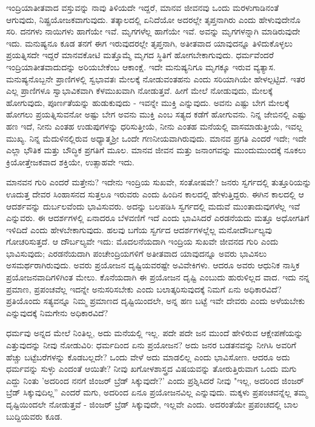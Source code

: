 ಇಂದ್ರಿಯಾತೀತವಾದ ವಸ್ತುವನ್ನು ನಾವು ತಿಳಿಯದೇ ಇದ್ದರೆ, ಮಾನವ ಜೀವನವು ಒಂದು ಮರಳುಗಾಡಿನಂತೆ ಆಗುವುದು, ನಿಷ್ಪ್ರಯೋಜಕವಾಗುವುದು. ತತ್ಕಾಲದಲ್ಲಿ ಏನಿದೆಯೋ ಅದರಲ್ಲೇ ತೃಪ್ತನಾಗಿರು ಎಂದು ಹೇಳುವುದೇನೊ ಸರಿ. ದನಗಳು ನಾಯಿಗಳು ಹಾಗೆಯೇ ಇವೆ. ಮೃಗಗಳೆಲ್ಲ ಹಾಗೆಯೇ ಇವೆ. ಅವನ್ನು ಮೃಗಗಳನ್ನಾಗಿ ಮಾಡಿರುವುದೇ ಇದು. ಮನುಷ್ಯನೂ ಕೂಡ ತನಗೆ ಈಗ ಇರುವುದರಲ್ಲೇ ತೃಪ್ತನಾಗಿ, ಅತೀತವಾದ ಯಾವುದನ್ನೂ ತಿಳಿದುಕೊಳ್ಳಲು ಪ್ರಯತ್ನಿಸದೇ ಇದ್ದರೆ ಮಾನವಕೋಟಿ ಮತ್ತೊಮ್ಮೆ ಮೃಗದ ಸ್ಥಿತಿಗೆ ಹೋಗಬೇಕಾಗುವುದು. ಧರ್ಮವೆಂದರೆ ಇಂದ್ರಿಯಾತೀತವಾದುದನ್ನು ಅರಿಯಬೇಕೆಂಬ ಆಕಾಂಕ್ಷೆ. ಇದೇ ಮನುಷ್ಯನಿಗೂ ಮೃಗಕ್ಕೂ ಇರುವ ವ್ಯತ್ಯಾಸ. ಮನುಷ್ಯನೊಬ್ಬನೇ ಪ್ರಾಣಿಗಳಲ್ಲಿ ಸ್ವಭಾವತಃ ಮೇಲಕ್ಕೆ ನೋಡುವಂತಹನು ಎಂದು ಸರಿಯಾಗಿಯೇ ಹೇಳಲ್ಪಟ್ಟಿದೆ. ಇತರ ಎಲ್ಲ ಪ್ರಾಣಿಗಳೂ ಸ್ವಾಭಾವಿಕವಾಗಿ ಕೆಳಮುಖವಾಗಿ ನೋಡುತ್ತವೆ. ಹೀಗೆ ಮೇಲೆ ನೋಡುವುದು, ಮೇಲಕ್ಕೆ ಹೋಗುವುದು, ಪೂರ್ಣತೆಯನ್ನು ಹುಡುಕುವುದು - ಇವನ್ನೇ ಮುಕ್ತಿ ಎನ್ನುವುದು. ಅವನು ಎಷ್ಟು ಬೇಗ ಮೇಲಕ್ಕೆ ಹೋಗಲು ಪ್ರಯತ್ನಿಸುವನೋ ಅಷ್ಟು ಬೇಗ ಅವನು ಮುಕ್ತಿ ಎಂಬ ಸತ್ಯದ ಕಡೆಗೆ ಹೋಗುವನು. ನಿನ್ನ ಜೇಬಿನಲ್ಲಿ ಎಷ್ಟು ಹಣ ಇದೆ, ನೀನು ಎಂತಹ ಉಡುಪುಗಳನ್ನು ಧರಿಸುತ್ತೀಯೆ, ನೀನು ಎಂತಹ ಮನೆಯಲ್ಲಿ ವಾಸಮಾಡುತ್ತೀಯೆ, ಇವಲ್ಲ ಮುಖ್ಯ. ನಿನ್ನ ಮೆದುಳಿನಲ್ಲಿರುವ ಅಧ್ಯಾತ್ಮಶ‍್ರೀ ಒಂದೇ ಗಣನೀಯವಾಗಿರುವುದು. ಮಾನವ ಪ್ರಗತಿ ಎಂದರೆ ಇದೇ; ಇದೇ ಎಲ್ಲಾ ಭೌತಿಕ ಮತ್ತು ಬೌದ್ಧಿಕ ಪ್ರಗತಿಗೆ ಮೂಲ. ಮಾನವ ಜೀವನ ಮತ್ತು ಜನಾಂಗವನ್ನು ಮುಂದುಮುಂದಕ್ಕೆ ನೂಕಲು ಕ್ರಿಯೋತ್ತೇಜಕವಾದ ಶಕ್ತಿಯೇ, ಉತ್ಸಾಹವೇ ಇದು.

ಮಾನವನ ಗುರಿ ಎಂದರೆ ಮತ್ತೇನು? ಇದೇನು ಇಂದ್ರಿಯ ಸುಖವೇ, ಸಂತೋಷವೇ? ಜನರು ಸ್ವರ್ಗದಲ್ಲಿ ತುತ್ತೂರಿಯನ್ನು ಊದುತ್ತ ದೇವರ ಸಿಂಹಾಸನದ ಸುತ್ತಲೂ ಇರುವರು ಎಂದು ಹಿಂದಿನ ಕಾಲದಲ್ಲಿ ಹೇಳುತ್ತಿದ್ದರು. ಈಗಿನ ಕಾಲದಲ್ಲಿ ಆ ಆದರ್ಶವನ್ನು ದುರ್ಬಲವೆಂದು ಭಾವಿಸುವರು. ಅದನ್ನು ಬಲಪಡಿಸಿ ಸ್ವರ್ಗದಲ್ಲಿ ಮದುವೆ ಮುಂತಾದುವುಗಳೆಲ್ಲ ಇವೆ ಎನ್ನುವರು. ಈ ಆದರ್ಶಗಳಲ್ಲಿ ಏನಾದರೂ ಬೆಳವಣಿಗೆ ಇದೆ ಎಂದು ಭಾವಿಸಿದರೆ ಎರಡನೆಯದು ಮತ್ತೂ ಅಧೋಗತಿಗೆ ಇಳಿದಿದೆ ಎಂದು ಹೇಳಬೇಕಾಗುವುದು. ಹಲವು ಬಗೆಯ ಸ್ವರ್ಗದ ಆದರ್ಶಗಳಲ್ಲೆಲ್ಲ ಮನೋದೌರ್ಬಲ್ಯವು ಗೋಚರಿಸುತ್ತದೆ. ಆ ದೌರ್ಬಲ್ಯವೇ ಇದು: ಮೊದಲನೆಯದಾಗಿ ಇಂದ್ರಿಯ ಸುಖವೇ ಜೀವನದ ಗುರಿ ಎಂದು ಭಾವಿಸುವುದು; ಎರಡನೆಯದಾಗಿ ಪಂಚೇಂದ್ರಿಯಗಳಿಗೆ ಅತೀತವಾದ ಯಾವುದನ್ನೂ ಅವರು ಭಾವಿಸಲು ಅಸಮರ್ಥರಾಗಿರುವುದು. ಅವರು ಪ್ರಯೋಜನ ದೃಷ್ಟಿಯವರಷ್ಟೇ ಅವಿವೇಕಿಗಳು. ಆದರೂ ಅವರು ಆಧುನಿಕ ನಾಸ್ತಿಕ ಪ್ರಯೋಜನವಾದಿಗಳಿಗಿಂತ ಮೇಲು. ಕೊನೆಯದಾಗಿ ಈ ಪ್ರಯೋಜನ ದೃಷ್ಟಿ ಎಂಬುದು ಹುರುಳಿಲ್ಲದ ವಾದ. ಇದು ನನ್ನ ಪ್ರಮಾಣ, ಪ್ರಪಂಚವೆಲ್ಲ ಇದನ್ನೇ ಅನುಸರಿಸಬೇಕು ಎಂದು ಬಲಾತ್ಕರಿಸುವುದಕ್ಕೆ ನಿಮಗೆ ಏನು ಅಧಿಕಾರವಿದೆ? ಪ್ರತಿಯೊಂದು ಸತ್ಯವನ್ನೂ ನಿಮ್ಮ ಪ್ರಮಾಣದ ದೃಷ್ಟಿಯಿಂದಲೇ, ಅನ್ನ ಹಣ ಬಟ್ಟೆ ಇವೇ ದೇವರು ಎಂದು ಅಳೆಯಬೇಕು ಎನ್ನುವುದಕ್ಕೆ ನಿಮಗೇನು ಅಧಿಕಾರವಿದೆ?

ಧರ್ಮವು ಅನ್ನದ ಮೇಲೆ ನಿಂತಿಲ್ಲ, ಅದು ಮನೆಯಲ್ಲಿ ಇಲ್ಲ. ಪದೇ ಪದೇ ಜನ ಮುಂದೆ ಹೇಳಿರುವ ಆಕ್ಷೇಪಣೆಯನ್ನು ಎತ್ತುವುದನ್ನು ನೀವು ನೋಡುವಿರಿ: ಧರ್ಮದಿಂದ ಏನು ಪ್ರಯೋಜನ? ಅದು ಜನರ ಬಡತನವನ್ನು ನೀಗಿಸಿ ಅವರಿಗೆ ಹೆಚ್ಚು ಬಟ್ಟೆಬರೆಗಳನ್ನು ಕೊಡಬಲ್ಲದೇ? ಒಂದು ವೇಳೆ ಅದು ಮಾಡಲಿಲ್ಲ ಎಂದು ಭಾವಿಸೋಣ. ಆದರೂ ಅದು ಧರ್ಮವನ್ನು ಸುಳ್ಳು ಎಂದಂತೆ ಆಯಿತೇ? ನೀವು ಖಗೋಳಶಾಸ್ತ್ರದ ವಿಷಯವನ್ನು ತೋರುತ್ತಿರುವಾಗ ಒಂದು ಮಗು ಎದ್ದು ನಿಂತು 'ಅದರಿಂದ ನನಗೆ ಜಿಂಜರ್ ಬ್ರೆಡ್ ಸಿಕ್ಕುವುದೇ?' ಎಂದು ಪ್ರಶ್ನಿಸಿದರೆ ನೀವು "ಇಲ್ಲ, ಅದರಿಂದ ಜಿಂಜರ್ ಬ್ರೆಡ್ ಸಿಕ್ಕುವುದಿಲ್ಲ” ಎಂದರೆ ಮಗು, ಅದರಿಂದ ಏನೂ ಪ್ರಯೋಜನವಿಲ್ಲ ಎನ್ನುವುದು. ಮಕ್ಕಳು ಪ್ರಪಂಚವನ್ನೆಲ್ಲ ತಮ್ಮ ದೃಷ್ಟಿಯಿಂದಲೇ ನೋಡುತ್ತವೆ - ಜಿಂಜರ್ ಬ್ರೆಡ್ ಸಿಕ್ಕುವುದೇ, ಇಲ್ಲವೇ ಎಂದು. ಅದರಂತೆಯೇ ಪ್ರಪಂಚದಲ್ಲಿ ಬಾಲ ಬುದ್ದಿಯವರು ಕೂಡ.

